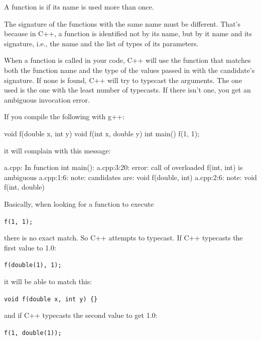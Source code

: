 

\newpage{}

A function is  if its name is used more than once.

The signature of the functions with the same name must be different.
That's because in C++, a function is identified not by
its name, but by it name and its signature, i.e., the name and the list
of types of its parameters.




When a function is called in your code, C++ will use the function that
matches both the function name and the type of the values passed in with
the candidate's signature. If none is found, C++ will try to typecast
the arguments. The one used is the one with the least number of
typecasts. If there isn't one, you get an ambiguous invocation error.



If you compile the following with g++:

\begin{consolethree}[escapeinside=||]
void f(double x, int y) {}
void f(int x, double y) {}
int main() { f(1, 1); }
\end{consolethree}

it will complain with this message:

\begin{consolethree}[escapeinside=||]
a.cpp: In function int main():
a.cpp:3:20: error: call of overloaded f(int, int) is
    ambiguous
a.cpp:1:6: note: candidates are: void f(double, int)
a.cpp:2:6: note: void f(int, double)
\end{consolethree}

Basically, when looking for a function to execute

\texttt{f(1, 1);}

there is no exact match. So C++ attempts to typecast. If C++ typecasts
the first value to 1.0:

\verb!f(double(1), 1);!

it will be able to match this:

\verb!void f(double x, int y) {}!

and if C++ typecasts the second value to get 1.0:

\verb!f(1, double(1));!

